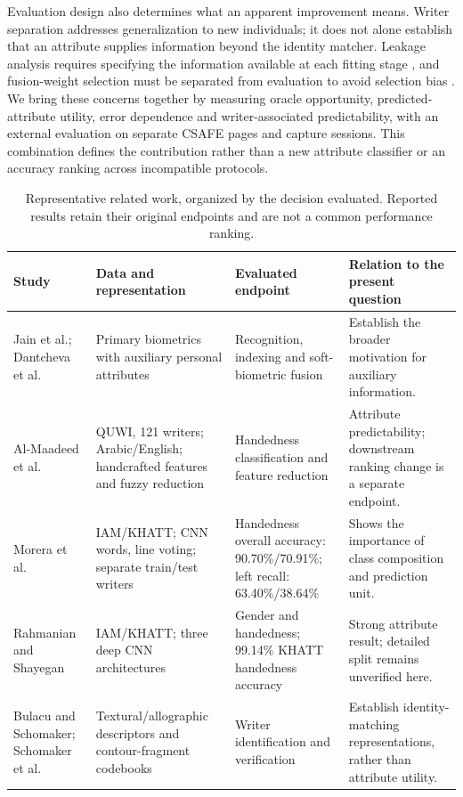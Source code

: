 Evaluation design also determines what an apparent improvement means. Writer separation addresses generalization to new individuals; it does not alone establish that an attribute supplies information beyond the identity matcher. Leakage analysis requires specifying the information available at each fitting stage \cite{kaufman2012leakage}, and fusion-weight selection must be separated from evaluation to avoid selection bias \cite{cawley2010selection}. We bring these concerns together by measuring oracle opportunity, predicted-attribute utility, error dependence and writer-associated predictability, with an external evaluation on separate CSAFE pages and capture sessions. This combination defines the contribution rather than a new attribute classifier or an accuracy ranking across incompatible protocols.

\begin{table}[!t]
\caption{Representative related work, organized by the decision evaluated. Reported results retain their original endpoints and are not a common performance ranking.}\label{tab:related}
\centering
\begin{tabularx}{\textwidth}{@{}p{}p{}p{}X@{}}\toprule
Study & Data and representation & Evaluated endpoint & Relation to the present question\\\midrule
Jain et al.; Dantcheva et al.\ \cite{jain2004soft,dantcheva2016soft} & Primary biometrics with auxiliary personal attributes & Recognition, indexing and soft-biometric fusion & Establish the broader motivation for auxiliary information.\\
Al-Maadeed et al.\ \cite{almaadeed2016handedness} & QUWI, 121 writers; Arabic/English; handcrafted features and fuzzy reduction & Handedness classification and feature reduction & Attribute predictability; downstream ranking change is a separate endpoint.\\
Morera et al.\ \cite{morera2018handedness} & IAM/KHATT; CNN words, line voting; separate train/test writers & Handedness overall accuracy: 90.70\%/70.91\%; left recall: 63.40\%/38.64\% & Shows the importance of class composition and prediction unit.\\
Rahmanian and Shayegan \cite{rahmanian2021handedness} & IAM/KHATT; three deep CNN architectures & Gender and handedness; 99.14\% KHATT handedness accuracy & Strong attribute result; detailed split remains unverified here.\\
Bulacu and Schomaker; Schomaker et al.\ \cite{bulacu2007text,schomaker2007codebooks} & Textural/allographic descriptors and contour-fragment codebooks & Writer identification and verification & Establish identity-matching representations, rather than attribute utility.\\

\end{tabularx}
\end{table}
